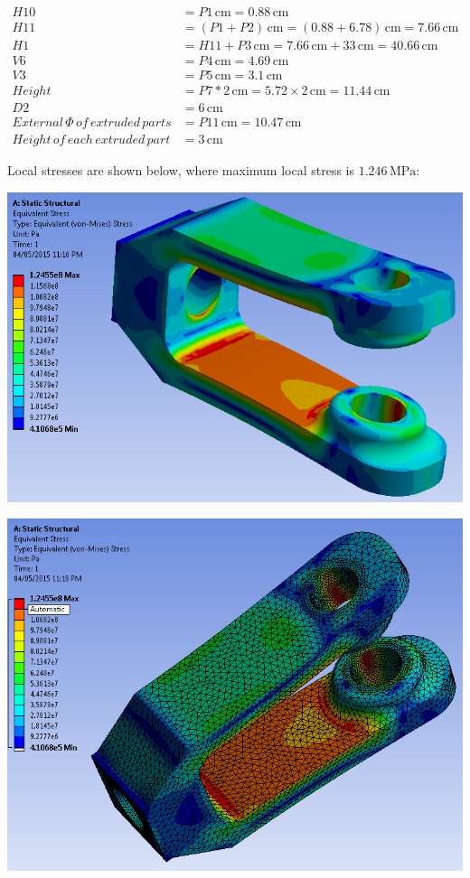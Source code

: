 \documentclass[a4paper,14pt]{extarticle}
\newcommand{\cm}{\,\si{\centi\meter}}
\begin{document}
\begin{align*}
H10 &= P1 \cm = 0.88 \cm\\
H11 &= (P1 + P2) \cm = (0.88 + 6.78) \cm = 7.66 \cm\\
H1 &= H11 + P3 \cm = 7.66 \cm + 33 \cm = 40.66 \cm\\
V6 &= P4 \cm = 4.69 \cm\\
V3 &= P5 \cm = 3.1 \cm\\
Height &= P7 * 2 \cm = 5.72 \times 2 \cm = 11.44 \cm\\
D2 &= 6 \cm\\
External\,\Phi\,of\,extruded\,parts &= P11\cm = 10.47\cm\\
Height\,of\,each\,extruded\,part &= 3\cm
\end{align*}

Local stresses are shown below, where maximum local stress is $1.246\,\si{\mega\pascal}$:

\includegraphics[width=\textwidth]{NX/fin_stress.PNG}

\includegraphics[width=\textwidth]{NX/fin_stress2.PNG}
\end{document}
